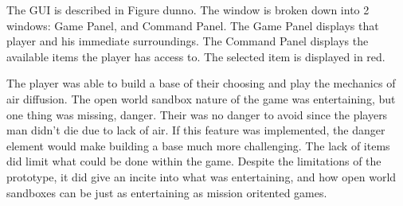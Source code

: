 The GUI is described in Figure dunno.
The window is broken down into 2 windows: Game Panel, and Command Panel.
The Game Panel displays that player and his immediate surroundings.
The Command Panel displays the available items the player has access to.
The selected item is displayed in red.


The player was able to build a base of their choosing and play the mechanics of air diffusion.
The open world sandbox nature of the game was entertaining, but one thing was missing, danger.
Their was no danger to avoid since the players man didn't die due to lack of air.
If this feature was implemented, the danger element would make building a base much more challenging.
The lack of items did limit what could be done within the game. 
Despite the limitations of the prototype, it did give an incite into what was entertaining, and how open world sandboxes can be just as entertaining as mission oritented games.


